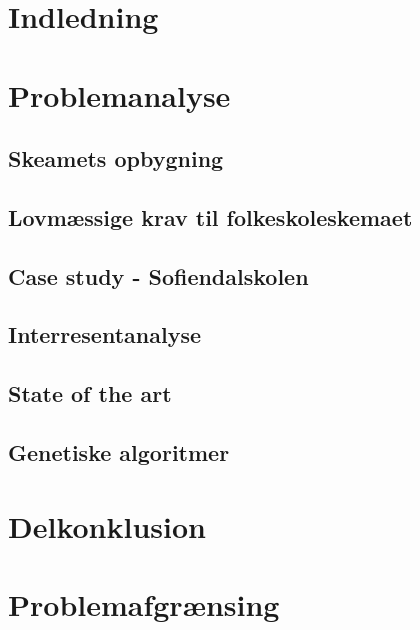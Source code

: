\section{Indledning}
  

\section{Problemanalyse}
  

  \subsection{Skeamets opbygning}
    

  \subsection{Lovmæssige krav til folkeskoleskemaet}
    

  \subsection{Case study - Sofiendalskolen}
    

  \subsection{Interresentanalyse}
    

  \subsection{State of the art}
    

  \subsection {Genetiske algoritmer}
    

\section{Delkonklusion}
  

\section{Problemafgrænsing}
  

